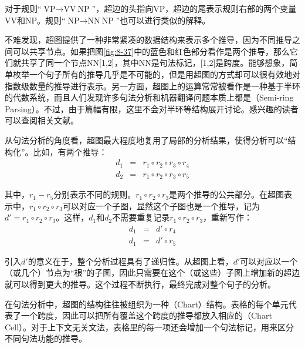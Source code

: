 \vspace{-1.0em}
\parinterval 对于规则“$\textrm{VP} \rightarrow \textrm{VV}\ \textrm{NP}$”，超边的头指向VP，超边的尾表示规则右部的两个变量VV和NP。规则“$\textrm{NP} \rightarrow \textrm{NN}\ \textrm{NP}$”也可以进行类似的解释。

\parinterval 不难发现，超图提供了一种非常紧凑的数据结构来表示多个推导，因为不同推导之间可以共享节点。如果把图\ref{fig:8-37}中的蓝色和红色部分看作是两个推导，那么它们就共享了同一个节点NN[1,2]，其中NN是句法标记，[1,2]是跨度。能够想象，简单枚举一个句子所有的推导几乎是不可能的，但是用超图的方式却可以很有效地对指数级数量的推导进行表示。另一方面，超图上的运算常常被看作是一种基于半环的代数系统，而且人们发现许多句法分析和机器翻译问题本质上都是{\small{}}（Semi-ring Parsing）。不过，由于篇幅有限，这里不会对半环等结构展开讨论。感兴趣的读者可以查阅相关文献。

\parinterval 从句法分析的角度看，超图最大程度地复用了局部的分析结果，使得分析可以“结构化”。比如，有两个推导：
\begin{eqnarray}
d_1 & = & {r_1} \circ {r_2} \circ {r_3} \circ {r_4} \label{eqa4.30}\\
d_2 & = & {r_1} \circ {r_2} \circ {r_3} \circ {r_5}
\label{eq:8-10}
\end{eqnarray}

\noindent 其中，$r_1 - r_5$分别表示不同的规则。${r_1} \circ {r_2} \circ {r_3}$是两个推导的公共部分。在超图表示中，${r_1} \circ {r_2} \circ {r_3}$可以对应一个子图，显然这个子图也是一个推导，记为${d'}= {r_1} \circ {r_2} \circ {r_3}$。这样，$d_1$和$d_2$不需要重复记录${r_1} \circ {r_2} \circ {r_3}$，重新写作：
\begin{eqnarray}
d_1 & = & {d'} \circ {r_4} \label{eqa4.32}\\
d_1 & = & {d'} \circ {r_5}
\label{eq:8-12}
\end{eqnarray}

\parinterval 引入$d'$的意义在于，整个分析过程具有了递归性。从超图上看，$d'$可以对应以一个（或几个）节点为“根”的子图，因此只需要在这个（或这些）子图上增加新的超边就可以得到更大的推导。这个过程不断执行，最终完成对整个句子的分析。

\parinterval 在句法分析中，超图的结构往往被组织为一种{\small{}}（Chart）结构。表格的每个单元代表了一个跨度，因此可以把所有覆盖这个跨度的推导都放入相应的{\small{}}（Chart Cell）。对于上下文无关文法，表格里的每一项还会增加一个句法标记，用来区分不同句法功能的推导。

